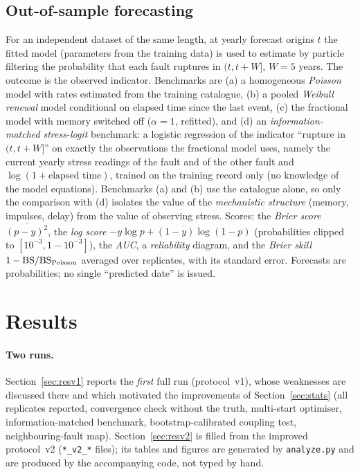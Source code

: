 \documentclass[11pt,a4paper]{article}
\begin{document}
\subsection{Out-of-sample forecasting}
For an independent dataset of the same length, at yearly forecast origins $t$ the fitted model (parameters from the training data) is used to estimate by particle filtering the probability that each fault ruptures in $(t,t+W]$, $W=5$ years. The outcome is the observed indicator. Benchmarks are (a) a homogeneous \emph{Poisson} model with rates estimated from the training catalogue, (b) a pooled \emph{Weibull renewal} model conditional on elapsed time since the last event, (c) the fractional model with memory switched off ($\alpha=1$, refitted), and (d) an \emph{information-matched} \emph{stress-logit} benchmark: a logistic regression of the indicator ``rupture in $(t,t+W]$'' on exactly the observations the fractional model uses, namely the current yearly stress readings of the fault and of the other fault and $\log(1+\text{elapsed time})$, trained on the training record only (no knowledge of the model equations). Benchmarks (a) and (b) use the catalogue alone, so only the comparison with (d) isolates the value of the \emph{mechanistic structure} (memory, impulses, delay) from the value of observing stress. Scores: the \emph{Brier score} $\overline{(p-y)^2}$, the \emph{log score} $-\overline{y\log p+(1-y)\log(1-p)}$ (probabilities clipped to $[10^{-3},1-10^{-3}]$), the \emph{AUC}, a \emph{reliability} diagram, and the \emph{Brier skill} $1-\mathrm{BS}/\mathrm{BS}_{\rm Poisson}$ averaged over replicates, with its standard error. Forecasts are probabilities; no single ``predicted date'' is issued.

\section{Results}\label{sec:results}
\paragraph{Two runs.}
Section~\ref{sec:resv1} reports the \emph{first} full run (protocol~v1), whose weaknesses are discussed there and which motivated the improvements of Section~\ref{sec:stats} (all replicates reported, convergence check without the truth, multi-start optimiser, information-matched benchmark, bootstrap-calibrated coupling test, neighbouring-fault map). Section~\ref{sec:resv2} is filled from the improved protocol~v2 (\texttt{*\_v2\_*} files); its tables and figures are generated by \texttt{analyze.py} and are produced by the accompanying code, not typed by hand.
\end{document}
